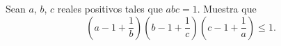 Sean $a$, $b$, $c$ reales positivos tales que $abc=1$. Muestra que 
\[ \left( a - 1 + \frac 1b \right) \left( b - 1 + \frac 1c \right) \left( c - 1 + \frac 1a \right) \leq 1. \]